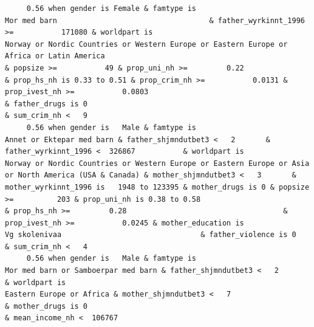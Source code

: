 \documentclass[
  letterpaper,
  DIV=11,
  numbers=noendperiod]{scrreprt}
\begin{document}
\begin{verbatim}
     0.56 when gender is Female & famtype is                                                     Mor med barn                                   & father_wyrkinnt_1996 >=           171080 & worldpart is                                           Norway or Nordic Countries or Western Europe or Eastern Europe or Africa or Latin America                                                                                                  & popsize >=           49 & prop_uni_nh >=         0.22                                      & prop_hs_nh is 0.33 to 0.51 & prop_crim_nh >=           0.0131 & prop_ivest_nh >=           0.0803                                                                                                                          & father_drugs is 0                                                                        & sum_crim_nh <   9
     0.56 when gender is   Male & famtype is                                        Annet or Ektepar med barn & father_shjmndutbet3 <   2       & father_wyrkinnt_1996 <  326867           & worldpart is                              Norway or Nordic Countries or Western Europe or Eastern Europe or Asia or North America (USA & Canada) & mother_shjmndutbet3 <   3       & mother_wyrkinnt_1996 is   1948 to 123395 & mother_drugs is 0 & popsize >=          203 & prop_uni_nh is 0.38 to 0.58                                      & prop_hs_nh >=         0.28                                    & prop_ivest_nh >=           0.0245 & mother_education is                                Vg skolenivaa                                & father_violence is 0                                                                                            & sum_crim_nh <   4
     0.56 when gender is   Male & famtype is                              Mor med barn or Samboerpar med barn & father_shjmndutbet3 <   2                                                  & worldpart is                                                                                                            Eastern Europe or Africa & mother_shjmndutbet3 <   7                                                  & mother_drugs is 0                                                         & mean_income_nh <  106767                                                                                                                                                                                                                                                                                                                                                      

\end{verbatim}
\end{document}
